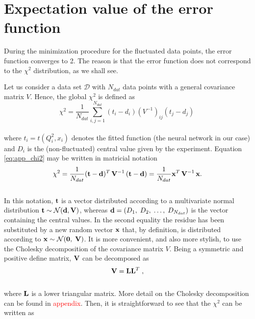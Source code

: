 \chapter{Expectation value of the error function}
\label{app:exp_err_func}

During the minimization procedure for the fluctuated data points, the error function converges to 2. The reason is that the error function does not correspond to the $\chi^2$ distribution, as we shall see.\par
Let us consider a data set $\mathcal{D}$ with $N_{dat}$ data points with a general covariance matrix $V$. Hence, the global $\chi^2$ is defined as 
\\
\begin{equation}
    \chi^2 = \frac{1}{N_{dat}}\sum_{i,j=1}^{N_{dat}} \left(t_i - d_i \right) \left( V^{-1} \right)_{ij} \left(t_j - d_j \right)\
\label{eq:app_chi2}
\end{equation}
\\
where $t_i = t(Q^2_i, x_i)$ denotes the fitted function (the neural network in our case) and $D_i$ is the (non-fluctuated) central value given by the experiment. Equation \eqref{eq:app_chi2} may be written in matricial notation 
\\
\begin{equation}
    \chi^2 = \frac{1}{N_{dat}} (\mathbf{t} - \mathbf{d})^{T} \, \mathbf{V}^{-1} \, (\mathbf{t} - \mathbf{d}) = \frac{1}{N_{dat}} \mathbf{x}^T \, \mathbf{V}^{-1} \, \mathbf{x}.
    \label{eq:app_chi2mat}
\end{equation}
\\
In this notation, $\mathbf{t}$ is a vector distributed according to a multivariate normal distribution $\mathbf{t} \sim \mathcal{N}(\mathbf{d},\mathbf{V})$, whereas $\mathbf{d} = (D_1,\; D_2,\; \dots,\;  D_{N_{dat}})$ is the vector containing the central values. In the second equality the residue has been substituted by a new random vector $\mathbf{x}$ that, by definition, is distributed according to $\mathbf{x} \sim \mathcal{N}(\mathbf{0},\; \mathbf{V})$. It is more convenient, and also more stylish, to use the Cholesky decomposition of the covariance matrix $V$. Being a symmetric and positive define matrix, $\mathbf{V}$ can be decomposed as
\\
\begin{equation}
    \mathbf{V} = \mathbf{L} \mathbf{L}^T \; ,
\label{eq:app_chodec}
\end{equation}
\\
where $\mathbf{L}$ is a lower triangular matrix. More detail on the Cholesky decomposition can be found in \textcolor{red}{appendix}. Then, it is straightforward to see that the $\chi^2$ can be written as
